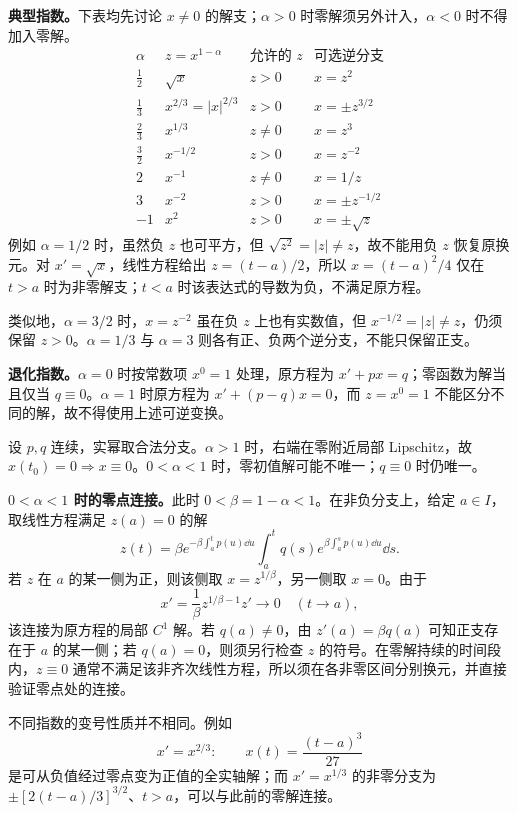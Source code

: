 \textbf{典型指数。}下表均先讨论 $x\ne0$ 的解支；$\alpha>0$ 时零解须另外计入，$\alpha<0$ 时不得加入零解。
\[
\begin{array}{c|c|c|c}
\alpha&z=x^{1-\alpha}&\text{允许的 }z&\text{可选逆分支}\\\hline
\frac12&\sqrt x&z>0&x=z^2\\
\frac13&x^{2/3}=|x|^{2/3}&z>0&x=\pm z^{3/2}\\
\frac23&x^{1/3}&z\ne0&x=z^3\\
\frac32&x^{-1/2}&z>0&x=z^{-2}\\
2&x^{-1}&z\ne0&x=1/z\\
3&x^{-2}&z>0&x=\pm z^{-1/2}\\
-1&x^2&z>0&x=\pm\sqrt z
\end{array}
\]
例如 $\alpha=1/2$ 时，虽然负 $z$ 也可平方，但 $\sqrt{z^2}=|z|\ne z$，故不能用负 $z$ 恢复原换元。对 $x'=\sqrt x$，线性方程给出 $z=(t-a)/2$，所以 $x=(t-a)^2/4$ 仅在 $t>a$ 时为非零解支；$t<a$ 时该表达式的导数为负，不满足原方程。

类似地，$\alpha=3/2$ 时，$x=z^{-2}$ 虽在负 $z$ 上也有实数值，但 $x^{-1/2}=|z|\ne z$，仍须保留 $z>0$。$\alpha=1/3$ 与 $\alpha=3$ 则各有正、负两个逆分支，不能只保留正支。

\textbf{退化指数。}$\alpha=0$ 时按常数项 $x^0=1$ 处理，原方程为 $x'+px=q$；零函数为解当且仅当 $q\equiv0$。$\alpha=1$ 时原方程为 $x'+(p-q)x=0$，而 $z=x^0=1$ 不能区分不同的解，故不得使用上述可逆变换。

\core 设 $p,q$ 连续，实幂取合法分支。$\alpha>1$ 时，右端在零附近局部 Lipschitz，故 $x(t_0)=0\Rightarrow x\equiv0$。$0<\alpha<1$ 时，零初值解可能不唯一；$q\equiv0$ 时仍唯一。

\textbf{$0<\alpha<1$ 时的零点连接。}此时 $0<\beta=1-\alpha<1$。在非负分支上，给定 $a\in I$，取线性方程满足 $z(a)=0$ 的解
\[
z(t)=\beta e^{-\beta\int_a^t p(u)\dd u}
\int_a^t q(s)e^{\beta\int_a^s p(u)\dd u}\dd s.
\]
若 $z$ 在 $a$ 的某一侧为正，则该侧取 $x=z^{1/\beta}$，另一侧取 $x=0$。由于
\[
x'=\frac1\beta z^{1/\beta-1}z'\longrightarrow0\quad(t\to a),
\]
该连接为原方程的局部 $C^1$ 解。若 $q(a)\ne0$，由 $z'(a)=\beta q(a)$ 可知正支存在于 $a$ 的某一侧；若 $q(a)=0$，则须另行检查 $z$ 的符号。在零解持续的时间段内，$z\equiv0$ 通常不满足该非齐次线性方程，所以须在各非零区间分别换元，并直接验证零点处的连接。

不同指数的变号性质并不相同。例如
\[
x'=x^{2/3}:\qquad x(t)=\frac{(t-a)^3}{27}
\]
是可从负值经过零点变为正值的全实轴解；而 $x'=x^{1/3}$ 的非零分支为 $\pm[2(t-a)/3]^{3/2}$、$t>a$，可以与此前的零解连接。

